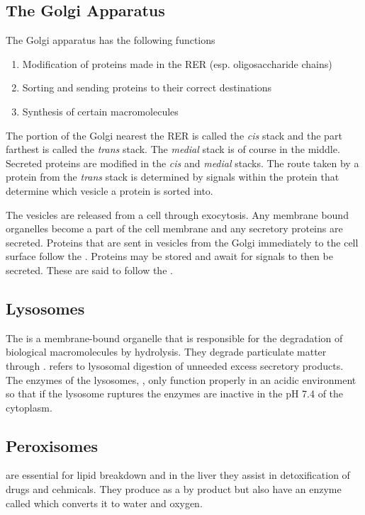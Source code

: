 \documentclass[../Bio_chemistryReview.tex]{subfiles}
\begin{document}
\subsection{The Golgi Apparatus}
The Golgi apparatus has the following functions
\begin{enumerate}
  \item Modification of proteins made in the RER (esp. oligosaccharide chains)
  \item Sorting and sending proteins to their correct destinations
  \item Synthesis of certain macromolecules
\end{enumerate}
The portion of the Golgi nearest the RER is called the \textit{cis} stack and
the part farthest is called the \textit{trans} stack. The \textit{medial} stack
is of course in the middle. Secreted proteins are modified in the
\textit{cis} and \textit{medial} stacks. The route taken by a protein from the
\textit{trans} stack is determined by signals within the protein that determine
which vesicle a protein is sorted into.\par

The vesicles are released from a cell through exocytosis. Any membrane bound
organelles become a part of the cell membrane and any secretory proteins are
secreted. Proteins that are sent in vesicles from the Golgi immediately to the
cell surface follow the . Proteins may be
stored and await for signals to then be secreted. These are said to follow the
.

\subsection{Lysosomes}
The  is a membrane-bound organelle that is responsible for the
degradation of biological macromolecules by hydrolysis. They degrade particulate
matter through .  refers to lysosomal
digestion of unneeded excess secretory products. The enzymes of the lysosomes,
, only function properly in an acidic environment so
that if the lysosome ruptures the enzymes are inactive in the pH 7.4 of the
cytoplasm.

\subsection{Peroxisomes}
 are essential for lipid breakdown and in the liver they
assist in detoxification of drugs and cehmicals. They produce
 as a by product but also have an enzyme called
 which converts it to water and oxygen.
\end{document}
